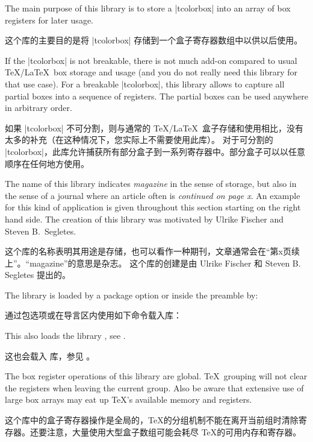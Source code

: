 \begin{articleside}[after skip=6pt]
The main purpose of this library is to store a |tcolorbox| into an array
of box registers for later usage.

这个库的主要目的是将 |tcolorbox| 存储到一个盒子寄存器数组中以供以后使用。

If the |tcolorbox| is not breakable, there is not much add-on
compared to usual \TeX/\LaTeX\ box storage and usage (and you do not really need this
library for that use case).
For a breakable |tcolorbox|, this library allows to capture all partial boxes
into a sequence of registers. The partial boxes can be used anywhere in
arbitrary order.

如果 |tcolorbox| 不可分割，则与通常的 \TeX/\LaTeX\ 盒子存储和使用相比，没有太多的补充（在这种情况下，您实际上不需要使用此库）。
对于可分割的 |tcolorbox|，此库允许捕获所有部分盒子到一系列寄存器中。部分盒子可以以任意顺序在任何地方使用。

\tcblower{}
\end{articleside}

The name of this library indicates \emph{magazine} in the sense of storage,
but also in the sense of a journal where an article often is \emph{continued on page x}.
An example for this kind of application is given throughout this section starting
on the right hand side. The creation of this library was motivated by
Ulrike Fischer and Steven B.~Segletes.

这个库的名称表明其用途是存储，也可以看作一种期刊，文章通常会在“第x页续上”。“magazine”的意思是杂志。
这个库的创建是由 Ulrike Fischer 和 Steven B. Segletes 提出的。

The library is loaded by a package option or inside the preamble by:

通过包选项或在导言区内使用如下命令载入库：
\begin{dispListing}
\end{dispListing}
This also loads the library , see .

这也会载入  库，参见 。
\begin{marker}
The box register operations of this library are global. \TeX\ grouping will
not clear the registers when leaving the current group. Also be aware that
extensive use of large box arrays may eat up \TeX's available memory and
registers.

这个库中的盒子寄存器操作是全局的，\TeX 的分组机制不能在离开当前组时清除寄存器。还要注意，大量使用大型盒子数组可能会耗尽 \TeX 的可用内存和寄存器。
\end{marker}

